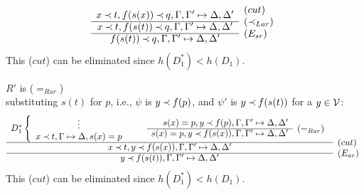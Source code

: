 \begin{PROOF}
\begin{LS}
\begin{LSA}
\begin{LSB}
\begin{LSC}
\begin{LSD}
\[\begin{array}{cl}
x\Incl t, f(s(x))\Incl q, \Gamma, \Gamma' \Seq \Delta, \Delta' 
 &   \raisebox{1.2ex}[1.5ex][0ex]{($cut$)} \\ \cline{1-1}
x\Incl t, f(s(t))\Incl q, \Gamma, \Gamma' \Seq \Delta, \Delta' 
 &   \rabove{\iLar} \\ \cline{1-1}
f(s(t))\Incl q, \Gamma, \Gamma' \Seq \Delta, \Delta' 
 &   \rabove{\Esr}
\end{array} \]
This ($cut$) can be eliminated since $h(D_1^*)<h(D_1)$.
%
\item $R'$ is ($=_{Rar}$)\\
substituting $s(t)$ for $p$, i.e., $\psi$ is $y\mathbin{\prec} f(p)$, and $\psi'$ is
$y\mathbin{\prec} f(s(t))$ for a $y\in{\cal V}$:
\[ \begin{array}{cl}
D_1^* \left \{ \begin{array}{c} \vdots \\ 
 x\Incl t, \GSD, s(x)=p \end{array} \right . \ \ \ \ \ \ 
\begin{array}{rl}
 s(x)=p, y\Incl f(p), \Gamma, \Gamma' \Seq \Delta, \Delta' \\
 \cline{1-1}
 s(x)=p, y\Incl f(s(x)), \Gamma, \Gamma' \Seq \Delta, \Delta' 
 &   \raisebox{1.2ex}[1.5ex][0ex]{($=_{Rar}$)} 
 \end{array} \\ \cline{1-1}
x\Incl t, y\Incl f(s(x)), \Gamma, \Gamma' \Seq \Delta, \Delta' 
 &   \raisebox{1.2ex}[1.5ex][0ex]{($cut$)} \\ \cline{1-1}
y\Incl f(s(t)), \Gamma, \Gamma' \Seq \Delta, \Delta' 
 &   \rabove{\Ear}
\end{array} \]
This ($cut$) can be eliminated since $h(D_1^*)<h(D_1)$.

\end{LSD}
\end{LSC}
\end{LSB}
\end{LSA}
\end{LS}
\end{PROOF}
